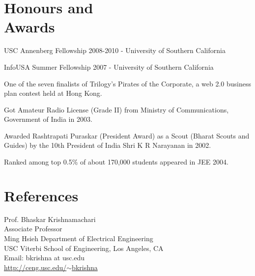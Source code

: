 \documentclass[margin,line]{resume}
\begin{document}
\begin{resume}
\section{\mysidestyle Honours and\\Awards} 
\begin{list2}
		\item USC Annenberg Fellowship 2008-2010	- University of Southern California
    \item InfoUSA Summer Fellowship 2007	- University of Southern California %
	  \item One of the seven finalists of Trilogy's Pirates of the Corporate, a web 2.0 business plan contest held at Hong Kong. %
	  \item Got Amateur Radio License (Grade II) from Ministry of Communications, Government of India in 2003.%
\item Awarded Rashtrapati Puraskar (President Award) as a Scout (Bharat Scouts and Guides) by the 10th President of India Shri K R Narayanan in 2002.%
\item Ranked among top 0.5\% of about 170,000 students appeared in JEE 2004. \\%
\end{list2}
  



\section{\mysidestyle References} 
Prof. Bhaskar Krishnamachari \\
Associate Professor \\
Ming Hsieh Department of Electrical Engineering \\
USC Viterbi School of Engineering, Los Angeles, CA \\
Email: bkrishna at usc.edu \\
\href{http://ceng.usc.edu/~bkrishna}{http://ceng.usc.edu/$\sim$bkrishna}


\end{resume}
\end{document}
